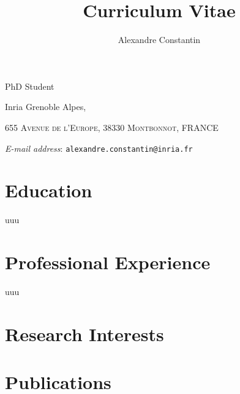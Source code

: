 \documentclass[]{personal_class}
\author{Alexandre Constantin}
\title{Curriculum Vitae}
\makeatletter
\newcommand{\Status}{{%
  \bigskip
  \Large

  PhD Student

}}
\newcommand{\Addresses}{{%
  \bigskip
  \footnotesize

  Inria Grenoble Alpes,\par \textsc{655 Avenue de l'Europe,
  38330 Montbonnot, FRANCE}\par\nopagebreak
  \textit{E-mail address}: \texttt{alexandre.constantin@inria.fr}

  \vspace{0.8em}
}}
\makeatother
\begin{document}
\maketitle

\makeatletter
\begin{center}
   \Status
   \Addresses
 \end{center}  
\makeatother

\section*{Education}
uuu

\section*{Professional Experience}
uuu

\section*{Research Interests}

\section*{Publications}

       
\end{document}
